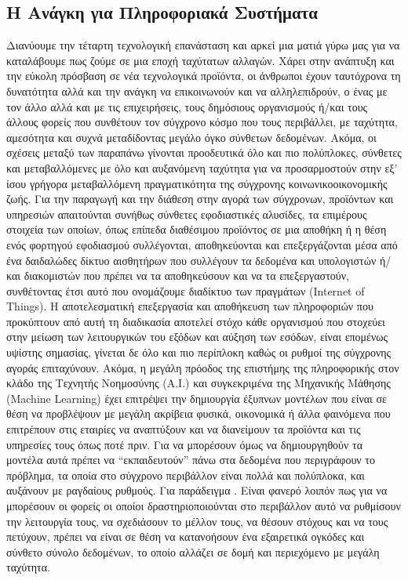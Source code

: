 \documentclass{article}
\begin{document}
\subsection{Η Ανάγκη για Πληροφοριακά Συστήματα}
Διανύουμε την τέταρτη τεχνολογική επανάσταση και αρκεί μια ματιά γύρω μας για να καταλάβουμε πως ζούμε σε μια εποχή ταχύτατων αλλαγών. Χάρει στην ανάπτυξη και την εύκολη πρόσβαση σε νέα τεχνολογικά προϊόντα, οι άνθρωποι έχουν ταυτόχρονα τη δυνατότητα αλλά και την ανάγκη να επικοινωνούν και να αλληλεπιδρούν, ο ένας με τον άλλο αλλά και με τις επιχειρήσεις, τους δημόσιους οργανισμούς ή/και τους άλλους φορείς που συνθέτουν τον σύγχρονο κόσμο που τους περιβάλλει, με ταχύτητα, αμεσότητα και συχνά μεταδίδοντας μεγάλο όγκο σύνθετων δεδομένων. Ακόμα, οι σχέσεις μεταξύ των παραπάνω γίνονται προοδευτικά όλο και πιο πολύπλοκες, σύνθετες και μεταβαλλόμενες με όλο και αυξανόμενη ταχύτητα για να προσαρμοστούν στην εξ’ ίσου γρήγορα μεταβαλλόμενη πραγματικότητα της σύγχρονης κοινωνικοοικονομικής ζωής. Για την παραγωγή και την διάθεση στην αγορά των σύγχρονων, προϊόντων και υπηρεσιών απαιτούνται συνήθως σύνθετες εφοδιαστικές αλυσίδες, τα επιμέρους στοιχεία των οποίων, όπως επίπεδα διαθέσιμου προϊόντος σε μια αποθήκη ή η θέση ενός φορτηγού εφοδιασμού συλλέγονται, αποθηκεύονται και επεξεργάζονται μέσα από ένα δαιδαλώδες δίκτυο αισθητήρων που συλλέγουν τα δεδομένα  και υπολογιστών ή/και διακομιστών που πρέπει να τα αποθηκεύσουν και να τα επεξεργαστούν, συνθέτοντας έτσι αυτό που ονομάζουμε διαδίκτυο των πραγμάτων (Internet of Things). Η αποτελεσματική επεξεργασία και αποθήκευση των πληροφοριών που προκύπτουν από αυτή τη διαδικασία αποτελεί στόχο κάθε οργανισμού που στοχεύει στην μείωση των λειτουργικών του εξόδων και αύξηση των εσόδων, είναι επομένως υψίστης σημασίας, γίνεται δε όλο και πιο περίπλοκη καθώς οι ρυθμοί της σύγχρονης αγοράς επιταχύνουν. Ακόμα, η μεγάλη πρόοδος της επιστήμης της πληροφορικής στον κλάδο της Τεχνητής Νοημοσύνης (A.I.) και συγκεκριμένα της Μηχανικής Μάθησης (Machine Learning) έχει επιτρέψει την δημιουργία έξυπνων μοντέλων που είναι σε θέση να προβλέψουν με μεγάλη ακρίβεια φυσικά, οικονομικά ή άλλα φαινόμενα που επιτρέπουν στις εταιρίες να αναπτύξουν και να διανείμουν τα προϊόντα και τις υπηρεσίες τους όπως ποτέ πριν. Για να μπορέσουν όμως να δημιουργηθούν τα μοντέλα αυτά πρέπει να “εκπαιδευτούν” πάνω στα δεδομένα που περιγράφουν το πρόβλημα, τα οποία στο σύγχρονο περιβάλλον είναι πολλά και πολύπλοκα, και αυξάνουν με ραγδαίους ρυθμούς. Για παράδειγμα . Είναι φανερό λοιπόν πως για να μπορέσουν οι φορείς οι οποίοι δραστηριοποιούνται στο περιβάλλον αυτό να ρυθμίσουν την λειτουργία τους, να σχεδιάσουν το μέλλον τους, να θέσουν στόχους και να τους πετύχουν, πρέπει να  είναι σε θέση να κατανοήσουν ένα εξαιρετικά ογκόδες και σύνθετο σύνολο δεδομένων, το οποίο αλλάζει σε δομή και περιεχόμενο με μεγάλη ταχύτητα.
\end{document}

